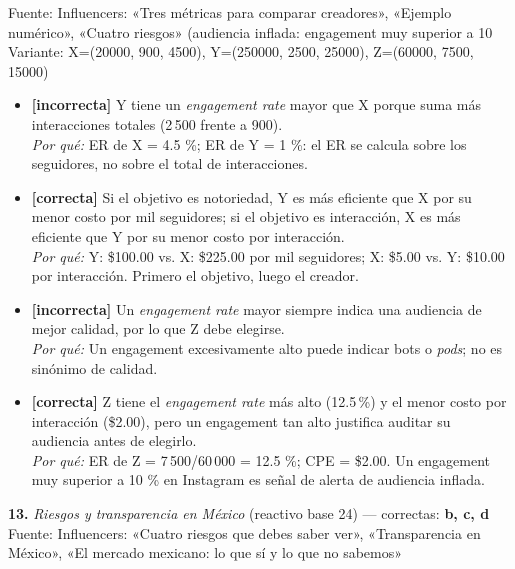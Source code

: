 \documentclass[10pt,letterpaper]{article}
\begin{document}
{\scriptsize Fuente: Influencers: «Tres métricas para comparar creadores», «Ejemplo numérico», «Cuatro riesgos» (audiencia inflada: engagement muy superior a 10 %
\\{\scriptsize Variante: X=(20000, 900, 4500), Y=(250000, 2500, 25000), Z=(60000, 7500, 15000)}
\begin{itemize}[leftmargin=1.2em,itemsep=0pt,topsep=1pt,parsep=0pt]
\item[\textbf{a)}] {\footnotesize \textbf{[incorrecta]} Y tiene un \textit{engagement rate} mayor que X porque suma más interacciones totales (2\,500 frente a 900).\\ \textit{Por qué:} ER de X = 4.5 \%; ER de Y = 1 \%: el ER se calcula sobre los seguidores, no sobre el total de interacciones.}
\item[\textbf{b)}] {\footnotesize \textbf{[correcta]} Si el objetivo es notoriedad, Y es más eficiente que X por su menor costo por mil seguidores; si el objetivo es interacción, X es más eficiente que Y por su menor costo por interacción.\\ \textit{Por qué:} Y: \$100.00 vs. X: \$225.00 por mil seguidores; X: \$5.00 vs. Y: \$10.00 por interacción. Primero el objetivo, luego el creador.}
\item[\textbf{c)}] {\footnotesize \textbf{[incorrecta]} Un \textit{engagement rate} mayor siempre indica una audiencia de mejor calidad, por lo que Z debe elegirse.\\ \textit{Por qué:} Un engagement excesivamente alto puede indicar bots o \textit{pods}; no es sinónimo de calidad.}
\item[\textbf{d)}] {\footnotesize \textbf{[correcta]} Z tiene el \textit{engagement rate} más alto (12.5\,\%) y el menor costo por interacción (\$2.00), pero un engagement tan alto justifica auditar su audiencia antes de elegirlo.\\ \textit{Por qué:} ER de Z = 7\,500/60\,000 = 12.5 \%; CPE = \$2.00. Un engagement muy superior a 10 \% en Instagram es señal de alerta de audiencia inflada.}
\end{itemize}
\vspace{3pt}\noindent\textbf{13.} \textit{Riesgos y transparencia en México} (reactivo base 24) — correctas: \textbf{b, c, d}\\[-1pt]
{\scriptsize Fuente: Influencers: «Cuatro riesgos que debes saber ver», «Transparencia en México», «El mercado mexicano: lo que sí y lo que no sabemos»}
\begin{itemize}[leftmargin=1.2em,itemsep=0pt,topsep=1pt,parsep=0pt]

\end{itemize}}
\end{document}
